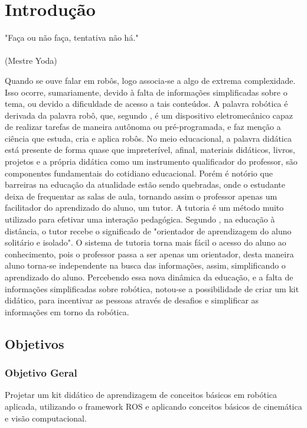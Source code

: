\chapter{Introdução}
\label{chap:intro}
\begin{flushright}
	"Faça ou não faça, tentativa não há." \\
	\ \\
	(Mestre Yoda)
\end{flushright}

Quando se ouve falar em robôs, logo associa-se a algo de extrema complexidade. Isso ocorre, sumariamente, devido à falta de informações simplificadas sobre o tema, ou devido a dificuldade de acesso a tais conteúdos. A palavra robótica é derivada da palavra robô, que, segundo \cite{goncalves2007}, é um dispositivo eletromecânico capaz de realizar tarefas de maneira autônoma ou pré-programada, e faz menção a ciência que estuda, cria e aplica robôs. 
No meio educacional, a palavra didática está presente de forma quase que impreterível, afinal, materiais didáticos, livros, projetos e a própria didática como um instrumento qualificador do professor, são componentes fundamentais do cotidiano educacional. Porém é notório que barreiras na educação da atualidade estão sendo quebradas, onde o estudante deixa de frequentar as salas de aula, tornando assim o professor apenas um facilitador do aprendizado do aluno, um tutor. A tutoria é um método muito utilizado para efetivar uma interação pedagógica. Segundo \cite{sa1998}, na educação à distância, o tutor recebe o significado de "orientador de aprendizagem do aluno solitário e isolado".
O sistema de tutoria torna mais fácil o acesso do aluno ao conhecimento, pois o professor passa a ser apenas um orientador, desta maneira aluno torna-se independente na busca das informações, assim, simplificando o aprendizado do aluno. Percebendo essa nova dinâmica da educação, e a falta de informações simplificadas sobre robótica, notou-se a possibilidade de criar um kit didático, para incentivar as pessoas através de desafios e simplificar as informações em torno da robótica.


\section{Objetivos}
\subsection{Objetivo Geral}
Projetar um kit didático de aprendizagem de conceitos básicos em robótica aplicada, utilizando o framework ROS e aplicando conceitos básicos de cinemática e visão computacional.


